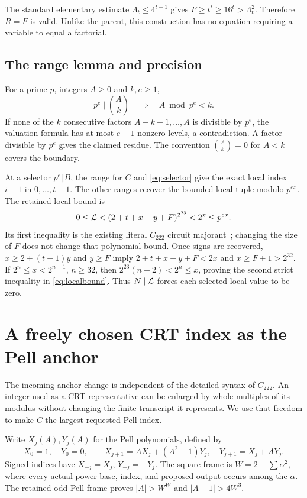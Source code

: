 The standard elementary estimate $\Lambda_t\le4^{t-1}$ gives
$F\ge t^t\ge16^t>\Lambda_t^2$. Therefore $R=F$ is valid. Unlike
the parent, this construction has no equation requiring a variable to
equal a factorial.

\subsection{The range lemma and precision}

For a prime $p$, integers $A\ge0$ and $k,e\ge1$,
\begin{equation}\label{eq:rangelemma}
 p^e\mid\binom{A}{k}\quad\Longrightarrow\quad A\bmod p^e<k.
\end{equation}
If none of the $k$ consecutive factors $A-k+1,\ldots,A$ is divisible
by $p^e$, the valuation formula has at most $e-1$ nonzero levels, a
contradiction. A factor divisible by $p^e$ gives the claimed residue.
The convention $\binom{A}{k}=0$ for $A<k$ covers the boundary.

At a selector $p^e\Vert B$, the range for $C$ and
\eqref{eq:selector} give the exact local index $i-1$ in $0,\ldots,t-1$.
The other ranges recover the bounded local tuple modulo $p^{ex}$.
The retained local bound is
\begin{equation}\label{eq:localbound}
 0\le\mathcal L<(2+t+x+y+F)^{2^{23}}<2^x\le p^{ex}.
\end{equation}
Its first inequality is the existing literal $C_{222}$ circuit
majorant~\cite{strictbudget}; changing the size of $F$ does not change
that polynomial bound. Once signs are recovered,
$x\ge2+(t+1)y$ and $y\ge F$ imply $2+t+x+y+F<2x$ and
$x\ge F+1>2^{32}$. If $2^n\le x<2^{n+1}$, $n\ge32$, then
$2^{23}(n+2)<2^n\le x$, proving the second strict inequality in
\eqref{eq:localbound}. Thus $N\mid\mathcal L$ forces each selected local
value to be zero.

\section{A freely chosen CRT index as the Pell anchor}

The incoming anchor change is independent of the detailed syntax of $C_{222}$.
An integer used as a CRT representative can be enlarged by whole multiples
of its modulus without changing the finite transcript it represents.
We use that freedom to make $C$ the largest requested Pell index.

Write $X_j(A),Y_j(A)$ for the Pell polynomials, defined by
\[
 X_0=1,\quad Y_0=0,\qquad
 X_{j+1}=AX_j+(A^2-1)Y_j,\quad Y_{j+1}=X_j+AY_j.
\]
Signed indices have $X_{-j}=X_j$, $Y_{-j}=-Y_j$.
The square frame is $W=2+\sum\alpha^2$, where every actual power base,
index, and proposed output occurs among the $\alpha$. The retained odd
Pell frame proves $|A|>W^W$ and $|A-1|>4W^3$.

